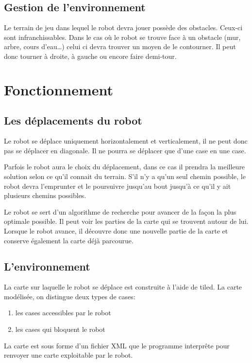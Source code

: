 \documentclass[a4paper 12pts]{article}
\begin{document}
\subsection{Gestion de l'environnement}
Le terrain de jeu dans lequel le robot devra jouer possède des obstacles. Ceux-ci sont infranchissables. Dans le cas où le robot se trouve face à un obstacle (mur, arbre, cours d'eau\ldots) celui ci devra trouver un moyen de le contourner. Il peut donc tourner à droite, à gauche ou encore faire demi-tour.


\section{Fonctionnement}

\subsection{Les déplacements du robot}
Le robot se déplace uniquement horizontalement et verticalement, il ne peut donc pas se déplacer en diagonale. Il ne pourra se déplacer que d'une case en une case.

Parfois le robot aura le choix du déplacement, dans ce cas il prendra la meilleure solution selon ce qu'il connait du terrain. S'il n'y a qu'un seul chemin possible, le robot devra l'emprunter et le poursuivre jusqu'au bout jusqu'à ce qu'il y ait plusieurs chemins possibles.

Le robot se sert d'un algorithme de recherche pour avancer de la façon la plus optimale possible. Il peut voir les parties de la carte qui se trouvent autour de lui. Lorsque le robot avance, il découvre donc une nouvelle partie de la carte et conserve également la carte déjà parcourue.

\subsection{L'environnement}
La carte sur laquelle le robot se déplace est construite à l'aide de tiled. La carte modélisée, on distingue deux types de cases:

\begin{enumerate}
	\item les cases accessibles par le robot
	\item les cases qui bloquent le robot
\end{enumerate}

La carte est sous forme d'un fichier XML que le programme interprête pour renvoyer une carte exploitable par le robot.
\end{document}
